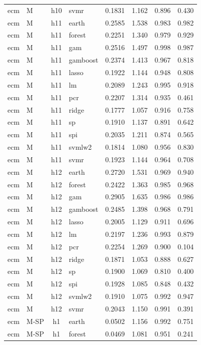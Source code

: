 \begin{ThreePartTable}
\begin{longtable}[t]{llclcccc}
ecm & M & h10 & svmr & 0.1831 & 1.162 & 0.896 & 0.430\\
\addlinespace
ecm & M & h11 & earth & 0.2585 & 1.538 & 0.983 & 0.982\\
ecm & M & h11 & forest & 0.2251 & 1.340 & 0.979 & 0.929\\
ecm & M & h11 & gam & 0.2516 & 1.497 & 0.998 & 0.987\\
ecm & M & h11 & gamboost & 0.2374 & 1.413 & 0.967 & 0.818\\
ecm & M & h11 & lasso & 0.1922 & 1.144 & 0.948 & 0.808\\
ecm & M & h11 & lm & 0.2089 & 1.243 & 0.995 & 0.918\\
ecm & M & h11 & pcr & 0.2207 & 1.314 & 0.935 & 0.461\\
ecm & M & h11 & ridge & 0.1777 & 1.057 & 0.916 & 0.758\\
ecm & M & h11 & sp & 0.1910 & 1.137 & 0.891 & 0.642\\
ecm & M & h11 & spi & 0.2035 & 1.211 & 0.874 & 0.565\\
ecm & M & h11 & svmlw2 & 0.1814 & 1.080 & 0.956 & 0.830\\
ecm & M & h11 & svmr & 0.1923 & 1.144 & 0.964 & 0.708\\
\addlinespace
ecm & M & h12 & earth & 0.2720 & 1.531 & 0.969 & 0.940\\
ecm & M & h12 & forest & 0.2422 & 1.363 & 0.985 & 0.968\\
ecm & M & h12 & gam & 0.2905 & 1.635 & 0.986 & 0.986\\
ecm & M & h12 & gamboost & 0.2485 & 1.398 & 0.968 & 0.791\\
ecm & M & h12 & lasso & 0.2005 & 1.129 & 0.911 & 0.696\\
ecm & M & h12 & lm & 0.2197 & 1.236 & 0.993 & 0.879\\
ecm & M & h12 & pcr & 0.2254 & 1.269 & 0.900 & 0.104\\
ecm & M & h12 & ridge & 0.1871 & 1.053 & 0.888 & 0.627\\
ecm & M & h12 & sp & 0.1900 & 1.069 & 0.810 & 0.400\\
ecm & M & h12 & spi & 0.1928 & 1.085 & 0.848 & 0.432\\
ecm & M & h12 & svmlw2 & 0.1910 & 1.075 & 0.992 & 0.947\\
ecm & M & h12 & svmr & 0.2043 & 1.150 & 0.991 & 0.391\\
\addlinespace
ecm & M-SP & h1 & earth & 0.0502 & 1.156 & 0.992 & 0.751\\
ecm & M-SP & h1 & forest & 0.0469 & 1.081 & 0.951 & 0.241\\

\end{longtable}
\end{ThreePartTable}
